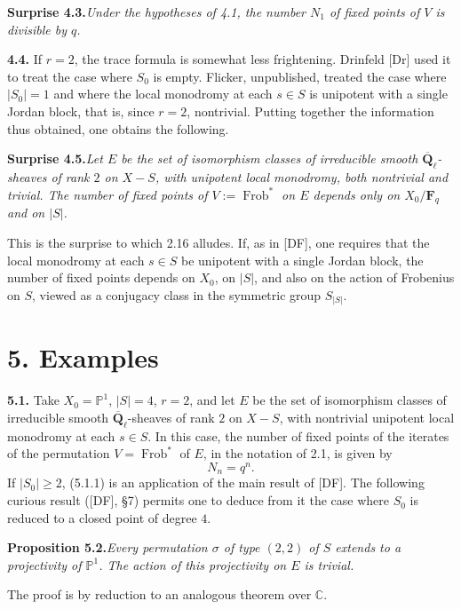 \documentclass[11pt]{article}
\newcommand{\Fq}{\mathbf{F}_q}
\newcommand{\Qbl}{\overline{\mathbf{Q}}_{\ell}}
\newcommand{\Frob}{\operatorname{Frob}}
\newcommand{\C}{\mathbb{C}}
\newcommand{\Pone}{\mathbb{P}^{1}}
\newcommand{\para}[1]{\medskip\noindent\textbf{#1}\enspace}
\begin{document}
\noindent\textbf{Surprise 4.3.}\quad\textit{Under the hypotheses of 4.1, the number \(N_1\) of fixed points of \(V\) is divisible by \(q\).}

\para{4.4.} If \(r=2\), the trace formula is somewhat less frightening. Drinfeld [Dr] used it to treat the case where \(S_0\) is empty. Flicker, unpublished, treated the case where \(|S_0|=1\) and where the local monodromy at each \(s\in S\) is unipotent with a single Jordan block, that is, since \(r=2\), nontrivial. Putting together the information thus obtained, one obtains the following.

\noindent\textbf{Surprise 4.5.}\quad\textit{Let \(E\) be the set of isomorphism classes of irreducible smooth \(\Qbl\)-sheaves of rank \(2\) on \(X-S\), with unipotent local monodromy, both nontrivial and trivial. The number of fixed points of \(V:=\Frob^*\) on \(E\) depends only on \(X_0/\Fq\) and on \(|S|\).}

This is the surprise to which 2.16 alludes. If, as in [DF], one requires that the local monodromy at each \(s\in S\) be unipotent with a single Jordan block, the number of fixed points depends on \(X_0\), on \(|S|\), and also on the action of Frobenius on \(S\), viewed as a conjugacy class in the symmetric group \(S_{|S|}\).

\section*{5. Examples}

\para{5.1.} Take \(X_0=\Pone\), \(|S|=4\), \(r=2\), and let \(E\) be the set of isomorphism classes of irreducible smooth \(\Qbl\)-sheaves of rank \(2\) on \(X-S\), with nontrivial unipotent local monodromy at each \(s\in S\). In this case, the number of fixed points of the iterates of the permutation \(V=\Frob^*\) of \(E\), in the notation of 2.1, is given by
\begin{equation}
  N_n=q^n.
\tag{5.1.1}
\end{equation}
If \(|S_0|\geq 2\), (5.1.1) is an application of the main result of [DF]. The following curious result ([DF], §7) permits one to deduce from it the case where \(S_0\) is reduced to a closed point of degree \(4\).

\noindent\textbf{Proposition 5.2.}\quad\textit{Every permutation \(\sigma\) of type \((2,2)\) of \(S\) extends to a projectivity of \(\Pone\). The action of this projectivity on \(E\) is trivial.}

The proof is by reduction to an analogous theorem over \(\C\).
\end{document}
